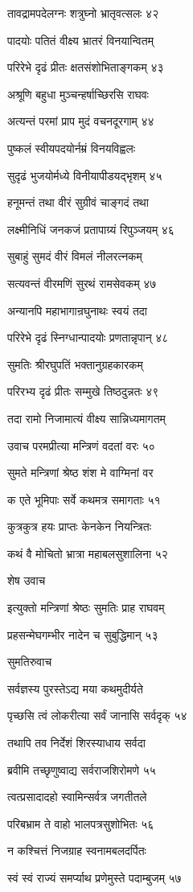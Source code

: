 तावद्रामपदेलग्नः शत्रुघ्नो भ्रातृवत्सलः ४२

पादयोः पतितं वीक्ष्य भ्रातरं विनयान्वितम्

परिरेभे दृढं प्रीतः क्षतसंशोभिताङ्गकम् ४३

अश्रूणि बहुधा मुञ्चन्हर्षाच्छिरसि राघवः

अत्यन्तं परमां प्राप मुदं वचनदूरगाम् ४४

पुष्कलं स्वीयपदयोर्नम्रं विनयविह्वलः

सुदृढं भुजयोर्मध्ये विनीयापीडयद्भृशम् ४५

हनूमन्तं तथा वीरं सुग्रीवं चाङ्गदं तथा

लक्ष्मीनिधिं जनकजं प्रतापाग्र्यं रिपुञ्जयम् ४६

सुबाहुं सुमदं वीरं विमलं नीलरत्नकम्

सत्यवन्तं वीरमणिं सुरथं रामसेवकम् ४७

अन्यानपि महाभागान्रघुनाथः स्वयं तदा

परिरेभे दृढं स्निग्धान्पादयोः प्रणतान्नृपान् ४८

सुमतिः श्रीरघुपतिं भक्तानुग्रहकारकम्

परिरभ्य दृढं प्रीतः सम्मुखे तिष्ठदुन्नतः ४९

तदा रामो निजामात्यं वीक्ष्य सान्निध्यमागतम्

उवाच परमप्रीत्या मन्त्रिणं वदतां वरः ५०

सुमते मन्त्रिणां श्रेष्ठ शंश मे वाग्मिनां वर

क एते भूमिपाः सर्वे कथमत्र समागताः ५१

कुत्रकुत्र हयः प्राप्तः केनकेन नियन्त्रितः

कथं वै मोचितो भ्रात्रा महाबलसुशालिना ५२

शेष उवाच

इत्युक्तो मन्त्रिणां श्रेष्ठः सुमतिः प्राह राघवम्

प्रहसन्मेघगम्भीर नादेन च सुबुद्धिमान् ५३

सुमतिरुवाच

सर्वज्ञस्य पुरस्तेऽद्य मया कथमुदीर्यते

पृच्छसि त्वं लोकरीत्या सर्वं जानासि सर्वदृक् ५४

तथापि तव निर्देशं शिरस्याधाय सर्वदा

ब्रवीमि तच्छृणुष्वाद्य सर्वराजशिरोमणे ५५

त्वत्प्रसादादहो स्वामिन्सर्वत्र जगतीतले

परिबभ्राम ते वाहो भालपत्रसुशोभितः ५६

न कश्चित्तं निजग्राह स्वनामबलदर्पितः

स्वं स्वं राज्यं समर्प्याथ प्रणेमुस्ते पदाम्बुजम् ५७

